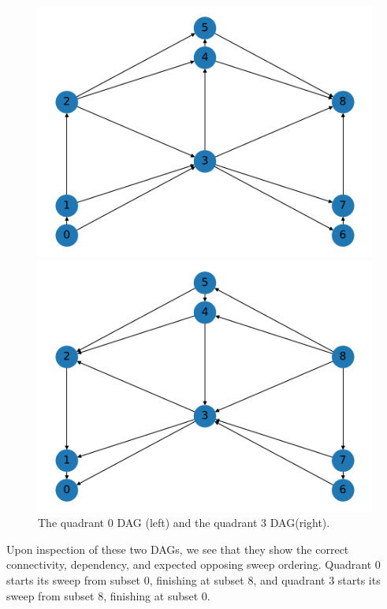 \begin{figure}[H]
\begin{minipage}[c]{0.5\textwidth}
\includegraphics[scale=0.5]{../../figures/9_graph0.pdf}
\end{minipage}
\begin{minipage}[c]{0.5\textwidth}
\includegraphics[scale=0.5]{../../figures/9_graph3.pdf}
\end{minipage}
\caption{The quadrant 0 DAG (left) and the quadrant 3 DAG(right).}
\label{25_q0q3graphs}
\end{figure}
Upon inspection of these two DAGs, we see that they show the correct connectivity, dependency, and expected opposing sweep ordering. 
Quadrant 0 starts its sweep from subset 0, finishing at subset 8, and quadrant 3 starts its sweep from subset 8, finishing at subset 0.

